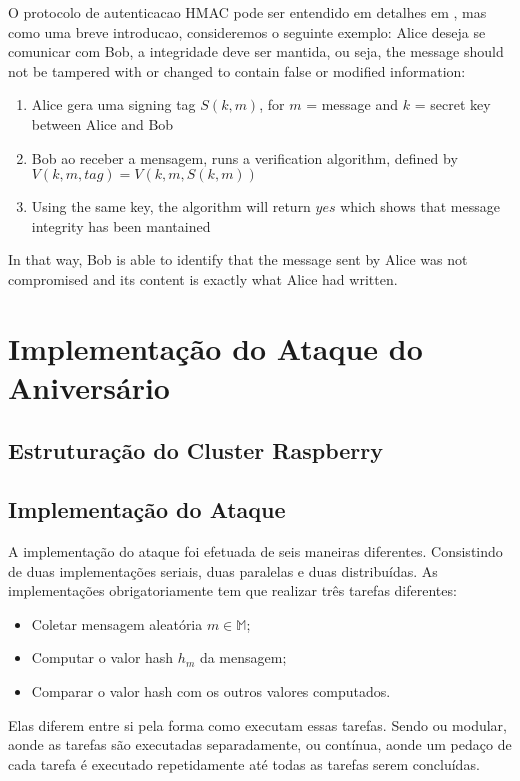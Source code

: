 \documentclass[12pt]{article}
\begin{document}
O protocolo de autenticacao HMAC pode ser entendido em detalhes em \cite{krawczyk1997hmac}, mas como uma breve
introducao, consideremos o seguinte exemplo: Alice deseja se comunicar com Bob, a integridade deve ser
mantida, ou seja, the message should not be tampered with or changed to contain false or modified information:
\begin{enumerate}
\item Alice gera uma signing tag \(S(k, m)\), for \(m\) = message and \(k\) = secret key between Alice and Bob
\item Bob ao receber a mensagem, runs a verification algorithm, defined by \(V(k, m, tag) = V(k, m, S(k, m))\)
\item Using the same key, the algorithm will return \(yes\) which shows that message integrity has been mantained
\end{enumerate}

In that way, Bob is able to identify that the message sent by Alice was not compromised and its content
is exactly what Alice had written.

\fi

\section{Implementação do Ataque do Aniversário}

\subsection{Estruturação do Cluster Raspberry}

\subsection{Implementação do Ataque}

A implementação do ataque foi efetuada de seis maneiras diferentes. Consistindo de duas implementações seriais, duas 
paralelas e duas distribuídas. As implementações obrigatoriamente tem que realizar três tarefas diferentes:
\begin{itemize}
 \item Coletar mensagem aleatória \(m \in \mathbb{M}\);
 \item Computar o valor hash \(h_m\) da mensagem;
 \item Comparar o valor hash com os outros valores computados.
\end{itemize}

Elas diferem entre si pela forma como executam essas tarefas. Sendo ou modular, aonde as tarefas são executadas 
separadamente, ou contínua, aonde um pedaço de cada tarefa é executado repetidamente até todas as tarefas serem 
concluídas.
\end{document}
